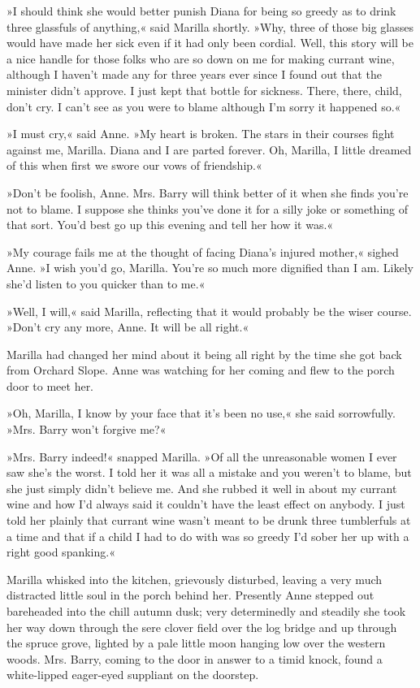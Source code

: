 »I should think she would better punish Diana for being so greedy as to drink three glassfuls of anything,« said Marilla shortly. »Why, three of those big glasses would have made her sick even if it had only been cordial. Well, this story will be a nice handle for those folks who are so down on me for making currant wine, although I haven’t made any for three years ever since I found out that the minister didn’t approve. I just kept that bottle for sickness. There, there, child, don’t cry. I can’t see as you were to blame although I’m sorry it happened so.«

»I must cry,« said Anne. »My heart is broken. The stars in their courses fight against me, Marilla. Diana and I are parted forever. Oh, Marilla, I little dreamed of this when first we swore our vows of friendship.«

»Don’t be foolish, Anne. Mrs. Barry will think better of it when she finds you’re not to blame. I suppose she thinks you’ve done it for a silly joke or something of that sort. You’d best go up this evening and tell her how it was.«

»My courage fails me at the thought of facing Diana’s injured mother,« sighed Anne. »I wish you’d go, Marilla. You’re so much more dignified than I am. Likely she’d listen to you quicker than to me.«

»Well, I will,« said Marilla, reflecting that it would probably be the wiser course. »Don’t cry any more, Anne. It will be all right.«

Marilla had changed her mind about it being all right by the time she got back from Orchard Slope. Anne was watching for her coming and flew to the porch door to meet her.

»Oh, Marilla, I know by your face that it’s been no use,« she said sorrowfully. »Mrs. Barry won’t forgive me?«

»Mrs. Barry indeed!« snapped Marilla. »Of all the unreasonable women I ever saw she’s the worst. I told her it was all a mistake and you weren’t to blame, but she just simply didn’t believe me. And she rubbed it well in about my currant wine and how I’d always said it couldn’t have the least effect on anybody. I just told her plainly that currant wine wasn’t meant to be drunk three tumblerfuls at a time and that if a child I had to do with was so greedy I’d sober her up with a right good spanking.«

Marilla whisked into the kitchen, grievously disturbed, leaving a very much distracted little soul in the porch behind her. Presently Anne stepped out bareheaded into the chill autumn dusk; very determinedly and steadily she took her way down through the sere clover field over the log bridge and up through the spruce grove, lighted by a pale little moon hanging low over the western woods. Mrs. Barry, coming to the door in answer to a timid knock, found a white-lipped eager-eyed suppliant on the doorstep.

